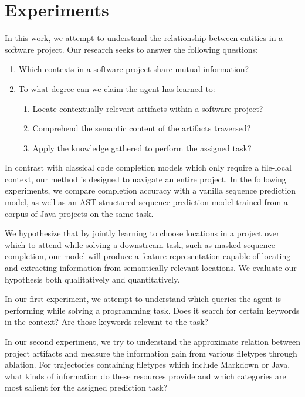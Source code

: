 \documentclass[11pt]{article}
\begin{document}
\section{Experiments}

In this work, we attempt to understand the relationship between entities in a software project. Our research seeks to answer the following questions:

\begin{enumerate}
  \item Which contexts in a software project share mutual information?
  \item To what degree can we claim the agent has learned to:\begin{enumerate}
  \item Locate contextually relevant artifacts within a software project?
  \item Comprehend the semantic content of the artifacts traversed?
  \item Apply the knowledge gathered to perform the assigned task?
  \end{enumerate}
\end{enumerate}

In contrast with classical code completion models which only require a file-local context, our method is designed to navigate an entire project. In the following experiments, we compare completion accuracy with a vanilla sequence prediction model, as well as an AST-structured sequence prediction model trained from a corpus of Java projects on the same task.

We hypothesize that by jointly learning to choose locations in a project over which to attend while solving a downstream task, such as masked sequence completion, our model will produce a feature representation capable of locating and extracting information from semantically relevant locations. We evaluate our hypothesis both qualitatively and quantitatively.

In our first experiment, we attempt to understand which queries the agent is performing while solving a programming task. Does it search for certain keywords in the context? Are those keywords relevant to the task?

In our second experiment, we try to understand the approximate relation between project artifacts and measure the information gain from various filetypes through ablation. For trajectories containing filetypes which include Markdown or Java, what kinds of information do these resources provide and which categories are most salient for the assigned prediction task?
\end{document}
